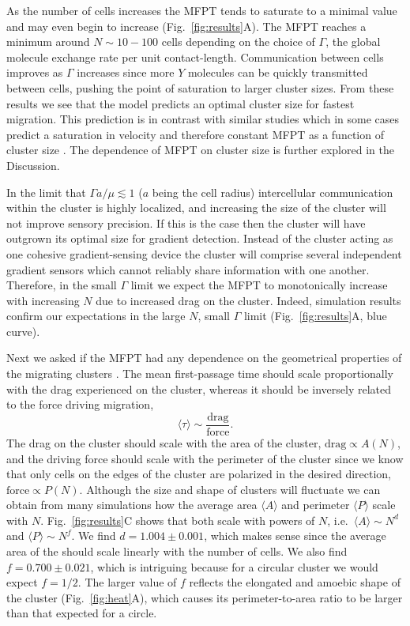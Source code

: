 As the number of cells increases the MFPT tends to saturate to a minimal value and may even begin to increase (Fig.\ \ref{fig:results}A). The MFPT reaches a minimum around $N \sim 10-100$ cells depending on the choice of $\Gamma$, the global molecule exchange rate per unit contact-length. Communication between cells improves as $\Gamma$ increases since more $Y$ molecules can be quickly transmitted between cells, pushing the point of saturation to larger cluster sizes. From these results we see that the model predicts an optimal cluster size for fastest migration. This prediction is in contrast with similar studies which in some cases predict a saturation in velocity and therefore constant MFPT as a function of cluster size \cite{camley2016emergent,malet2015collective}. The dependence of MFPT on cluster size is further explored in the Discussion.

In the limit that $\Gamma a / \mu \lesssim 1$ ($a$ being the cell radius) intercellular communication within the cluster is highly localized, and increasing the size of the cluster will not improve sensory precision. If this is the case then the cluster will have outgrown its optimal size for gradient detection. Instead of the cluster acting as one cohesive gradient-sensing device the cluster will comprise several independent gradient sensors which cannot reliably share information with one another. Therefore, in the small $\Gamma$ limit we expect the MFPT to monotonically increase with increasing $N$ due to increased drag on the cluster. Indeed, simulation results confirm our expectations in the large $N$, small $\Gamma$ limit (Fig.\ \ref{fig:results}A, blue curve).

Next we asked if the MFPT had any dependence on the geometrical properties of the migrating clusters \cite{camley2015collective}. The mean first-passage time should scale proportionally with the drag experienced on the cluster, whereas it should be inversely related to the force driving migration,
\begin{equation} \label{eq:fpt1}
    \langle\tau\rangle \sim \frac{\text{drag}}{\text{force}}.
\end{equation}
The drag on the cluster should scale with the area of the cluster, $\text{drag} \propto A(N)$, and the driving force should scale with the perimeter of the cluster since we know that only cells on the edges of the cluster are polarized in the desired direction, $\text{force} \propto P(N)$. Although the size and shape of clusters will fluctuate we can obtain from many simulations how the average area $\langle A \rangle$ and perimeter $\langle P \rangle$ scale with $N$.
Fig.\ \ref{fig:results}C shows that both scale with powers of $N$, i.e.\ $\langle A \rangle \sim N^d$ and $\langle P \rangle \sim N^f$. We find $d = 1.004 \pm 0.001$, which makes sense since the average area of the should scale linearly with the number of cells. We also find $f = 0.700 \pm 0.021$, which is intriguing because for a circular cluster we would expect $f = 1/2$. The larger value of $f$ reflects the elongated and amoebic shape of the cluster (Fig.\ \ref{fig:heat}A), which causes its perimeter-to-area ratio to be larger than that expected for a circle.


